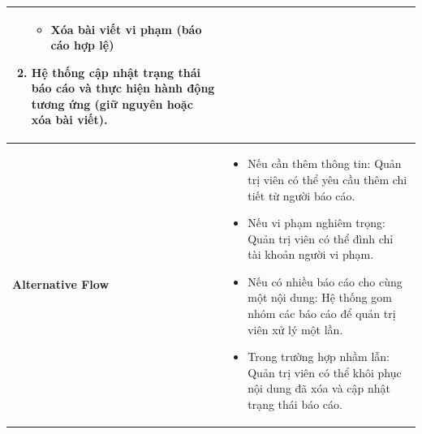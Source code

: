 \begin{longtable}{|>{\bfseries}m{4cm}|m{10cm}|}
\begin{enumerate}
\begin{itemize}
         \item Xóa bài viết vi phạm (báo cáo hợp lệ)
       \end{itemize}
    \item Hệ thống cập nhật trạng thái báo cáo và thực hiện hành động tương ứng (giữ nguyên hoặc xóa bài viết).
\end{enumerate} \\
\hline
Alternative Flow &
\begin{itemize}
    \item Nếu cần thêm thông tin: Quản trị viên có thể yêu cầu thêm chi tiết từ người báo cáo.
    \item Nếu vi phạm nghiêm trọng: Quản trị viên có thể đình chỉ tài khoản người vi phạm.
    \item Nếu có nhiều báo cáo cho cùng một nội dung: Hệ thống gom nhóm các báo cáo để quản trị viên xử lý một lần.
    \item Trong trường hợp nhầm lẫn: Quản trị viên có thể khôi phục nội dung đã xóa và cập nhật trạng thái báo cáo.
\end{itemize} \\
\hline
\end{longtable}

